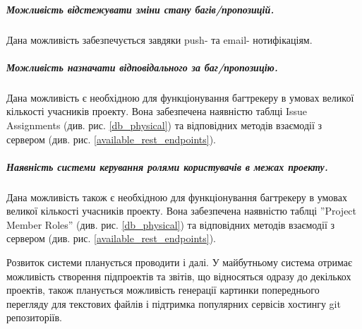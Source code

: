 \documentclass[../main.tex]{subfiles}
\begin{document}
\subparagraph{Можливість відстежувати зміни стану багів/пропозицій.}
Дана можливість забезпечується завдяки push- та email- нотифікаціям.

\subparagraph{Можливість назначати відповідального за баг/пропозицію.}
Дана можливість є необхідною для функціонування багтрекеру в умовах великої кількості учасників проекту. Вона забезпечена наявністю таблці Issue Assignments (див. рис. \ref{db_physical}) та відповідних методів взаємодії з сервером (див. рис. \ref{available_rest_endpoints}).

\subparagraph{Наявність системи керування ролями користувачів в межах проекту.}
Дана можливість також є необхідною для функціонування багтрекеру в умовах великої кількості учасників проекту. Вона забезпечена наявністю таблці ''Project Member Roles'' (див. рис. \ref{db_physical}) та відповідних методів взаємодії з сервером (див. рис. \ref{available_rest_endpoints}).

Розвиток системи планується проводити і далі. У майбутньому система отримає можливість створення підпроектів та звітів, що відносяться одразу до декількох проектів, також планується можливість генерації картинки попереднього перегляду для текстових файлів і підтримка популярних сервісів хостингу git репозиторіїв.
\end{document}
